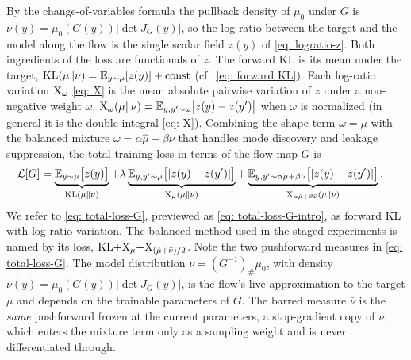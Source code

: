 \documentclass{article}
\begin{document}
By the change-of-variables formula the pullback density of $\mu_0$ under $G$ is $\nu(y) = \mu_0(G(y))|\det J_G(y)|$, so the log-ratio between the target and the model along the flow is the single scalar field $z(y)$ of \eqref{eq: logratio-z}. Both ingredients of the loss are functionals of $z$. The forward KL is its mean under the target, $\mathrm{KL}(\mu\|\nu) = \mathbb E_{y\sim\mu}[z(y)] + \mathrm{const}$ (cf.\ \eqref{eq: forward KL}). Each log-ratio variation $\mathrm{X}_\omega$ \eqref{eq: X} is the mean absolute pairwise variation of $z$ under a non-negative weight $\omega$, $\mathrm{X}_\omega(\mu\|\nu) = \mathbb E_{y, y'\sim\omega}\bigl|z(y) - z(y')\bigr|$ when $\omega$ is normalized (in general it is the double integral \eqref{eq: X}). Combining the shape term $\omega = \mu$ with the balanced mixture $\omega = \alpha\hat\mu + \beta\bar\nu$ that handles mode discovery and leakage suppression, the total training loss in terms of the flow map $G$ is
\begin{align}
    \mathcal{L}[G]
    &= \underbrace{\mathbb{E}_{y \sim \mu}\bigl[z(y)\bigr]}_{\mathrm{KL}(\mu\|\nu)}
     + \lambda \underbrace{\mathbb{E}_{y, y' \sim \mu}\bigl[|z(y) - z(y')|\bigr]}_{\mathrm{X}_\mu(\mu\|\nu)}
     + \underbrace{\mathbb{E}_{y, y' \sim \alpha\hat\mu + \beta\bar\nu}\bigl[|z(y) - z(y')|\bigr]}_{\mathrm{X}_{\alpha\hat\mu + \beta\bar\nu}(\mu\|\nu)} .
    \label{eq: total-loss-G}
\end{align}
We refer to \eqref{eq: total-loss-G}, previewed as \eqref{eq: total-loss-G-intro}, as forward KL with log-ratio variation. The balanced method used in the staged experiments is named by its loss, $\mathrm{KL}{+}\mathrm{X}_\mu{+}\mathrm{X}_{(\hat\mu+\bar\nu)/2}$. Note the two pushforward measures in \eqref{eq: total-loss-G}. The model distribution $\nu = (G^{-1})_{\#}\mu_0$, with density $\nu(y) = \mu_0(G(y))|\det J_G(y)|$, is the flow's live approximation to the target $\mu$ and depends on the trainable parameters of $G$. The barred measure $\bar\nu$ is the \emph{same} pushforward frozen at the current parameters, a stop-gradient copy of $\nu$, which enters the mixture term only as a sampling weight and is never differentiated through.
\end{document}
